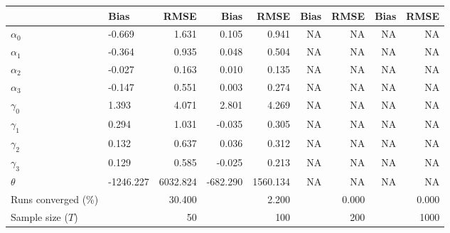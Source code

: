
\begin{tabular}[t]{llrrrrrrr}
\toprule
  & Bias & RMSE & Bias & RMSE & Bias & RMSE & Bias & RMSE\\
\midrule
$\alpha_{0}$ & -0.669 & 1.631 & 0.105 & 0.941 & NA & NA & NA & NA\\
$\alpha_{1}$ & -0.364 & 0.935 & 0.048 & 0.504 & NA & NA & NA & NA\\
$\alpha_{2}$ & -0.027 & 0.163 & 0.010 & 0.135 & NA & NA & NA & NA\\
$\alpha_{3}$ & -0.147 & 0.551 & 0.003 & 0.274 & NA & NA & NA & NA\\
$\gamma_{0}$ & 1.393 & 4.071 & 2.801 & 4.269 & NA & NA & NA & NA\\
$\gamma_{1}$ & 0.294 & 1.031 & -0.035 & 0.305 & NA & NA & NA & NA\\
$\gamma_{2}$ & 0.132 & 0.637 & 0.036 & 0.312 & NA & NA & NA & NA\\
$\gamma_{3}$ & 0.129 & 0.585 & -0.025 & 0.213 & NA & NA & NA & NA\\
$\theta$ & -1246.227 & 6032.824 & -682.290 & 1560.134 & NA & NA & NA & NA\\
Runs converged (\%) &  & 30.400 &  & 2.200 &  & 0.000 &  & 0.000\\
Sample size ($T$) &  & 50 &  & 100 &  & 200 &  & 1000\\
\bottomrule
\end{tabular}
